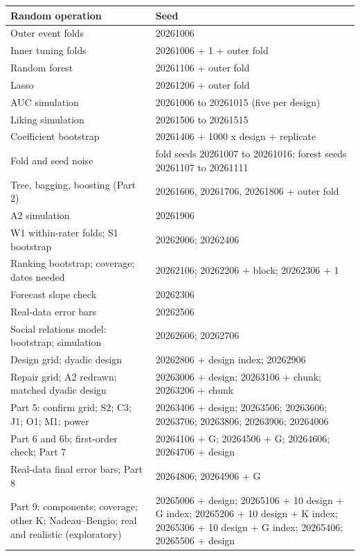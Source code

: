 \documentclass[11pt]{article}
\begin{document}
\small
\begin{center}
\begin{tabular}{L{5cm}L{9cm}}
\toprule
\textbf{Random operation} & \textbf{Seed} \\
\midrule
Outer event folds & 20261006 \\
Inner tuning folds & 20261006 + 1 + outer fold \\
Random forest & 20261106 + outer fold \\
Lasso & 20261206 + outer fold \\
AUC simulation & 20261006 to 20261015 (five per design) \\
Liking simulation & 20261506 to 20261515 \\
Coefficient bootstrap & 20261406 + 1000 x design + replicate \\
Fold and seed noise & fold seeds 20261007 to 20261016; forest seeds 20261107 to 20261111 \\
Tree, bagging, boosting (Part 2) & 20261606, 20261706, 20261806 + outer fold \\
A2 simulation & 20261906 \\
W1 within-rater folds; S1 bootstrap & 20262006; 20262406 \\
Ranking bootstrap; coverage; dates needed & 20262106; 20262206 + block; 20262306 + 1 \\
Forecast slope check & 20262306 \\
Real-data error bars & 20262506 \\
Social relations model: bootstrap; simulation & 20262606; 20262706 \\
Design grid; dyadic design & 20262806 + design index; 20262906 \\
Repair grid; A2 redrawn; matched dyadic design & 20263006 + design; 20263106 + chunk; 20263206 + chunk \\
Part 5: confirm grid; S2; C3; J1; O1; M1; power & 20263406 + design; 20263506; 20263606; 20263706; 20263806; 20263906; 20264006 \\
Part 6 and 6b; first-order check; Part 7 & 20264106 + G; 20264506 + G; 20264606; 20264706 + design \\
Real-data final error bars; Part 8 & 20264806; 20264906 + G \\
Part 9: components; coverage; other K; Nadeau--Bengio; real and realistic (exploratory) & 20265006 + design; 20265106 + 10 design + G index; 20265206 + 10 design + K index; 20265306 + 10 design + G index; 20265406; 20265506 + design \\
\bottomrule
\end{tabular}
\end{center}
\normalsize
\end{document}
